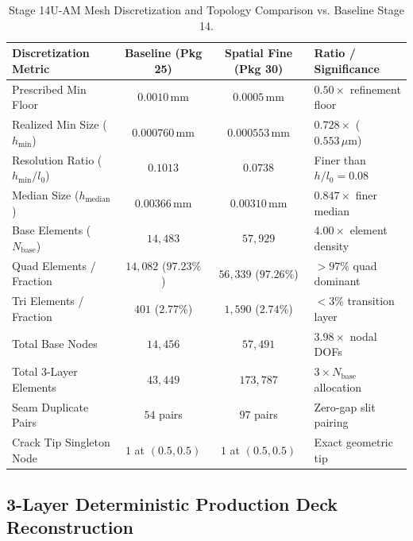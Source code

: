 \begin{table}[htbp]
\centering
\small
\caption{Stage 14U-AM Mesh Discretization and Topology Comparison vs. Baseline Stage 14.}
\label{tab:stage14uam_mesh_comparison}
\begin{tabularx}{\textwidth}{p{4.5cm} c c X}
\toprule
\textbf{Discretization Metric} & \textbf{Baseline (Pkg 25)} & \textbf{Spatial Fine (Pkg 30)} & \textbf{Ratio / Significance} \\
\midrule
Prescribed Min Floor & $0.0010\,\mathrm{mm}$ & $0.0005\,\mathrm{mm}$ & $0.50\times$ refinement floor \\
Realized Min Size ($h_{\min}$) & $0.000760\,\mathrm{mm}$ & $0.000553\,\mathrm{mm}$ & $0.728\times$ ($0.553\,\mu\mathrm{m}$) \\
Resolution Ratio ($h_{\min}/l_0$) & $0.1013$ & $0.0738$ & Finer than $h/l_0 = 0.08$ \\
Median Size ($h_{\mathrm{median}}$) & $0.00366\,\mathrm{mm}$ & $0.00310\,\mathrm{mm}$ & $0.847\times$ finer median \\
Base Elements ($N_{\mathrm{base}}$) & $14,483$ & $57,929$ & $4.00\times$ element density \\
Quad Elements / Fraction & $14,082$ ($97.23\%$) & $56,339$ ($97.26\%$) & $>97\%$ quad dominant \\
Tri Elements / Fraction & $401$ ($2.77\%$) & $1,590$ ($2.74\%$) & $<3\%$ transition layer \\
Total Base Nodes & $14,456$ & $57,491$ & $3.98\times$ nodal DOFs \\
Total 3-Layer Elements & $43,449$ & $173,787$ & $3 \times N_{\mathrm{base}}$ allocation \\
Seam Duplicate Pairs & $54$ pairs & $97$ pairs & Zero-gap slit pairing \\
Crack Tip Singleton Node & $1$ at $(0.5, 0.5)$ & $1$ at $(0.5, 0.5)$ & Exact geometric tip \\
\bottomrule
\end{tabularx}
\end{table}

\subsection{3-Layer Deterministic Production Deck Reconstruction}
\label{subsec:stage14uam_reconstruction}

